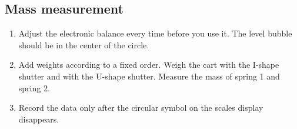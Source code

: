 \subsection{Mass measurement}
    \begin{enumerate}
        \item Adjust the electronic balance every time before you use it. The level bubble should be in the center of the circle.
        \item Add weights according to a fixed order. Weigh the cart with the I-shape shutter and with the U-shape shutter. Measure the mass of spring 1 and spring 2.
        \item Record the data only after the circular symbol on the scales display disappears.
    \end{enumerate}